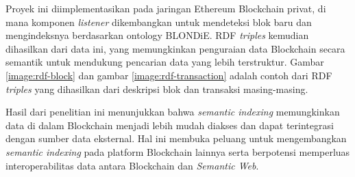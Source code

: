Proyek ini diimplementasikan pada jaringan Ethereum Blockchain privat, di mana komponen \textit{listener} dikembangkan untuk mendeteksi blok baru dan mengindeksnya berdasarkan ontology BLONDiE. RDF \textit{triples} kemudian dihasilkan dari data ini, yang memungkinkan penguraian data Blockchain secara semantik untuk mendukung pencarian data yang lebih terstruktur. Gambar \ref{image:rdf-block} dan gambar \ref{image:rdf-transaction} adalah contoh dari RDF \textit{triples} yang dihasilkan dari deskripsi blok dan transaksi masing-masing.

Hasil dari penelitian ini menunjukkan bahwa \textit{semantic indexing} memungkinkan data di dalam Blockchain menjadi lebih mudah diakses dan dapat terintegrasi dengan sumber data eksternal. Hal ini membuka peluang untuk mengembangkan \textit{semantic indexing} pada platform Blockchain lainnya serta berpotensi memperluas interoperabilitas data antara Blockchain dan \textit{Semantic Web}.